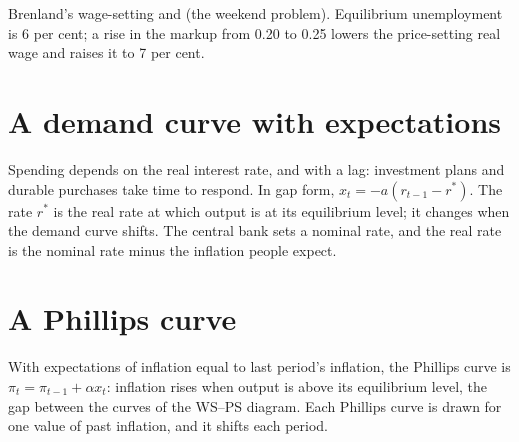 \begin{omfigure}

{\small Brenland's wage-setting and  (the weekend problem). Equilibrium unemployment is 6 per cent; a rise
in the markup from 0.20 to 0.25 lowers the price-setting real wage and raises it to 7 per cent.}
\end{omfigure}

\section{A demand curve with expectations}\label{sec:b2:three-equation-model:is}

Spending depends on the real interest rate, and with a lag: investment plans and durable purchases take time to respond.
In gap form, $x_t = -a(r_{t-1} - r^*)$. The rate $r^*$ is the real rate at which output is at its equilibrium level; it changes when the demand curve shifts. The
central bank sets a nominal rate, and the real rate is the nominal rate minus the inflation people expect.

\section{A Phillips curve}\label{sec:b2:three-equation-model:pc}

With expectations of inflation equal to last period's inflation, the Phillips curve is $\pi_t = \pi_{t-1} + \alpha x_t$: inflation rises when output is above its
equilibrium level, the gap between the curves of the WS--PS diagram. Each Phillips curve is drawn for one value of past
inflation, and it shifts each period.

